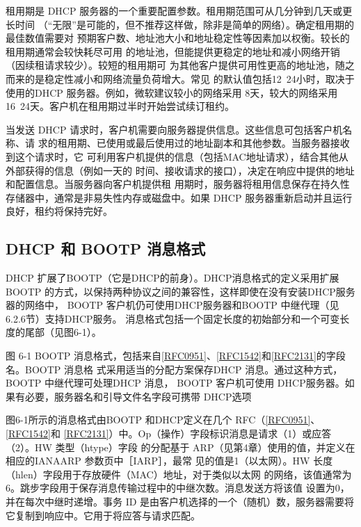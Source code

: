 租用期是 DHCP 服务器的一个重要配置参数。租用期范围可从几分钟到几天或更长时间
（“无限”是可能的，但不推荐这样做，除非是简单的网络）。确定租用期的最佳数值需要对
预期客户数、地址池大小和地址稳定性等因素加以权衡。较长的租用期通常会较快耗尽可用
的地址池，但能提供更稳定的地址和减小网络开销（因续租请求较少）。较短的租用期可
为其他客户提供可用性更高的地址池，随之而来的是稳定性减小和网络流量负荷增大。常见
的默认值包括12~24小时，取决于使用的DHCP 服务器。例如，微软建议较小的网络采用
8天，较大的网络采用16~24天。客户机在租用期过半时开始尝试续订租约。

当发送 DHCP 请求时，客户机需要向服务器提供信息。这些信息可包括客户机名称、请
求的租用期、已使用或最后使用过的地址副本和其他参数。当服务器接收到这个请求时，它
可利用客户机提供的信息（包括MAC地址请求），结合其他从外部获得的信息（例如一天的
时间、接收请求的接口），决定在响应中提供的地址和配置信息。当服务器向客户机提供租
用期时，服务器将租用信息保存在持久性存储器中，通常是非易失性内存或磁盘中。如果
DHCP 服务器重新启动并且运行良好，租约将保持完好。

\subsection{DHCP 和 BOOTP 消息格式}
DHCP 扩展了BOOTP（它是DHCP的前身）。DHCP消息格式的定义采用扩展 BOOTP
的方式，以保持两种协议之间的兼容性，这样即使在没有安装DHCP服务器的网络中，
BOOTP 客户机仍可使用DHCP服务器和BOOTP 中继代理（见6.2.6节）支持DHCP服务。
消息格式包括一个固定长度的初始部分和一个可变长度的尾部（见图6-1）。

图 6-1
BOOTP 消息格式，包括来自\href{https://www.rfc-editor.org/rfc/rfc0951}{\href{https://www.rfc-editor.org/rfc/rfc0951}{[RFC0951]}}、\href{https://www.rfc-editor.org/rfc/rfc1542}{\href{https://www.rfc-editor.org/rfc/rfc1542}{[RFC1542]}}和\href{https://www.rfc-editor.org/rfc/rfc2131}{\href{https://www.rfc-editor.org/rfc/rfc2131}{[RFC2131]}}的字段名。BOOTP 消息格
式采用适当的分配方案保存DHCP 消息。通过这种方式，BOOTP 中继代理可处理DHCP 消息，
BOOTP 客户机可使用 DHCP服务器。如果有必要，服务器名和引导文件名字段可携带 DHCP选项

图6-1所示的消息格式由BOOTP 和DHCP定义在几个 RFC（\href{https://www.rfc-editor.org/rfc/rfc0951}{\href{https://www.rfc-editor.org/rfc/rfc0951}{[RFC0951]}}、\href{https://www.rfc-editor.org/rfc/rfc1542}{\href{https://www.rfc-editor.org/rfc/rfc1542}{[RFC1542]}}和
\href{https://www.rfc-editor.org/rfc/rfc2131}{\href{https://www.rfc-editor.org/rfc/rfc2131}{[RFC2131]}}）中。Op（操作）字段标识消息是请求（1）或应答（2）。HW 类型（htype）字段
的分配基于 ARP（见第4章）使用的值，并定义在相应的IANAARP 参数页中［IARP］，最常
见的值是1（以太网）。HW 长度（hlen）字段用于存放硬件（MAC）地址，对于类似以太网
的网络，该值通常为6。跳步字段用于保存消息传输过程中的中继次数。消息发送方将该值
设置为0，并在每次中继时递增。事务 ID 是由客户机选择的一个（随机）数，服务器需要将
它复制到响应中。它用于将应答与请求匹配。

